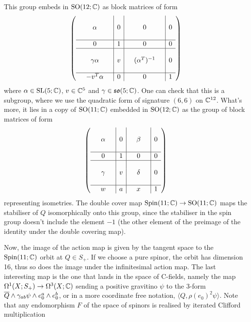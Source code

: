 \documentclass[10pt, oneside]{article}
\begin{document}
This group embeds in $\mathrm{SO}(12;\mathbb{C})$ as block matrices of form
\[\left(\begin{array}{ccc|c|ccc|c}
&&&&&&&\\
&\alpha&&0&&0&&0\\
&&&&&&&\\
\hline
&0&&1&&0&&0\\
\hline
&&&&&&&\\
&\gamma \alpha&&v&&(\alpha^T)^{-1}&&0\\
&&&&&&&\\
\hline
&-v^T\alpha&&0&&0&&1
\end{array}\right)\]
where $\alpha \in \mathrm{SL}(5;\mathbb{C})$, $v\in \mathbb{C}^5$ and $\gamma \in \mathfrak{so}(5;\mathbb{C})$.  One can check that this is a subgroup, where we use the quadratic form of signature $(6,6)$ on $\mathbb{C}^{12}$.  What's more, it lies in a copy of $\mathrm{SO}(11;\mathbb{C})$ embedded in $\mathrm{SO}(12;\mathbb{C})$ as the group of block matrices of form
\[\left(\begin{array}{ccc|c|ccc|c}
&&&&&&&\\
&\alpha&&0&&\beta&&0\\
&&&&&&&\\
\hline
&0&&1&&0&&0\\
\hline
&&&&&&&\\
&\gamma &&v&&\delta&&0\\
&&&&&&&\\
\hline
&w&&a&&x&&1
\end{array}\right)\]
representing isometries.  The double cover map $\mathrm{Spin}(11;\mathbb{C}) \to \mathrm{SO}(11;\mathbb{C})$ maps the stabiliser of $Q$ isomorphically onto this group, since the stabiliser in the spin group doesn't include the element $-1$ (the other element of the preimage of the identity under the double covering map). 

Now, the image of the action map is given by the tangent space to the $\mathrm{Spin}(11;\mathbb{C})$ orbit at $Q \in S_+$.  If we choose a pure spinor, the orbit has dimension 16, thus so does the image under the infinitesimal action map.  The last interesting map is the one that lands in the space of C-fields, namely the map $\Omega^1(X;S_+) \to \Omega^3(X;\mathbb{C})$ sending a positive gravitino $\psi$ to the 3-form $\overline{Q} \wedge \gamma_{ab} \psi \wedge e_0^a \wedge e_0^b$, or in a more coordinate free notation, $\langle Q, \rho(e_0)^2 \psi \rangle$.  Note that any endomorphism $F$ of the space of spinors is realised by iterated Clifford multiplication 
\end{document}
